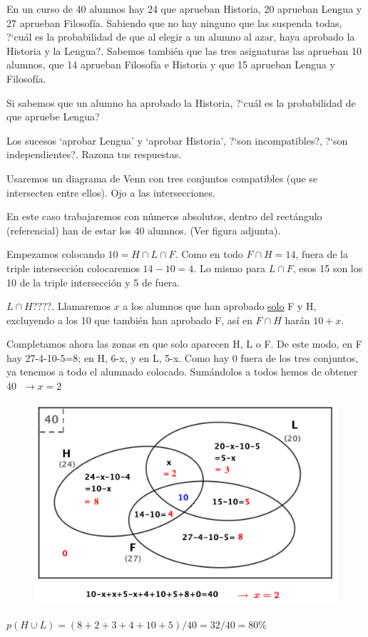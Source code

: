 \vspace{5mm}
\begin{ejemplo}
\begin{ejer}
En un curso de 40 alumnos hay 24 que aprueban Historia, 20 aprueban Lengua y 27 aprueban Filosofía. Sabiendo que no hay ninguno que las suspenda todas, ?`cuál es la probabilidad de que al elegir a un alumno al azar, haya aprobado la Historia y la Lengua?. Sabemos también que las tres asignaturas las aprueban 10 alumnos, que 14 aprueban Filosofía e Historia y que 15 aprueban Lengua y Filosofía.

Si sabemos que un alumno ha aprobado la Historia, ?`cuál es la probabilidad de que apruebe Lengua?

Los sucesos `aprobar Lengua' y `aprobar Historia', ?`son incompatibles?, ?`son independientes?. Razona tus respuestas.	
\end{ejer}
\end{ejemplo}
Usaremos un diagrama de Venn con tres conjuntos compatibles (que se intersecten entre ellos). Ojo a las intersecciones.

En este caso trabajaremos con números absolutos, dentro del rectángulo (referencial) han de estar los 40 alumnos. (Ver figura adjunta).

Empezamos colocando $10=H\cap L\cap F$. Como en todo $F\cap H=14$, fuera de la triple intersección colocaremos $14-10=4$. Lo mismo para $L\cap F$, esos 15 son los 10 de la triple intersección y 5 de fuera.

$L\cap H????$.  Llamaremos $x$ a los alumnos que han aprobado \underline{solo} F y H, excluyendo a los 10 que también han aprobado F, así en $F\cap H$ harán $10+x$.

Completamos ahora las zonas en que solo aparecen H, L o F. De este modo, en F hay 27-4-10-5=8; en H, 6-x, y en L, 5-x. Como hay 0 fuera de los tres conjuntos, ya tenemos a todo el alumnado colocado. Sumándolos a todos hemos de obtener 40 $\ \to x=2$
	\begin{figure}[H]
				\centering
			\includegraphics[width=.7\textwidth]{imagenes/imagenes02/T02IM32.png}
	\end{figure}
$p(H\cup L)=(8+2+3+4+10+5)/40=32/40=80\%$

